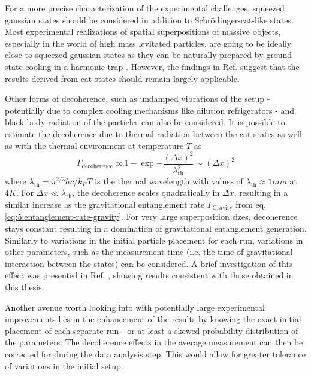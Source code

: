 For a more precise characterization of the experimental challenges, squeezed gaussian states \cite[p. 33-64]{Serafini_2017} should be considered in addition to Schrödinger-cat-like states.
Most experimental realizations of spatial superpositions of massive objects, especially in the world of high mass levitated particles, are going to be ideally close to squeezed gaussian states \cite[Timestamp: 23:00]{Aspelmeyer_2024} as they can be naturally prepared by ground state cooling in a harmonic trap \cite{Weiss_2021}.
However, the findings in Ref. \cite{Pedernales_2023} suggest that the results derived from cat-states should remain largely applicable.

Other forms of decoherence, such as undamped vibrations of the setup - potentially due to complex cooling mechanisms like dilution refrigerators - and black-body radiation of the particles can also be considered.
It is possible to estimate the decoherence due to thermal radiation \cite[p. 127-136]{Schlosshauer_2007} between the cat-states as well as with the thermal environment at temperature $T$ as \cite{RomeroIsart_2011}
\begin{equation}
  \Gamma_\mathrm{decoherence} \propto 1 - \exp{-\frac{(\Delta x)^2}{\lambda^2_\mathrm{th}}} \sim (\Delta x)^2
\end{equation}
where $\lambda_\mathrm{th} = \pi^{2/3} \hbar c / k_B T$ is the thermal wavelength with values of $\lambda_\mathrm{th} \approx 1\si{mm}$ at $4\si{K}$. 
For $\Delta x \ll \lambda_\mathrm{th}$, the decoherence scales quadratically in $\Delta x$, resulting in a similar increase as the gravitational entanglement rate $\Gamma_\mathrm{Gravity}$ from eq. \eqref{eq:5:entanglement-rate-gravity}.
For very large superposition sizes, decoherence stays constant resulting in a domination of gravitational entanglement generation.
Similarly to variations in the initial particle placement for each run, variations in other parameters, such as the measurement time (i.e. the time of gravitational interaction between the states) can be considered.
A brief investigation of this effect was presented in Ref. \cite{Nguyen_2020}, showing results consistent with those obtained in this thesis.

Another avenue worth looking into with potentially large experimental improvements lies in the enhancement of the results by knowing the exact initial placement of each separate run - or at least a skewed probability distribution of the parameters.
The decoherence effects in the average measurement can then be corrected for during the data analysis step.
This would allow for greater tolerance of variations in the initial setup.

